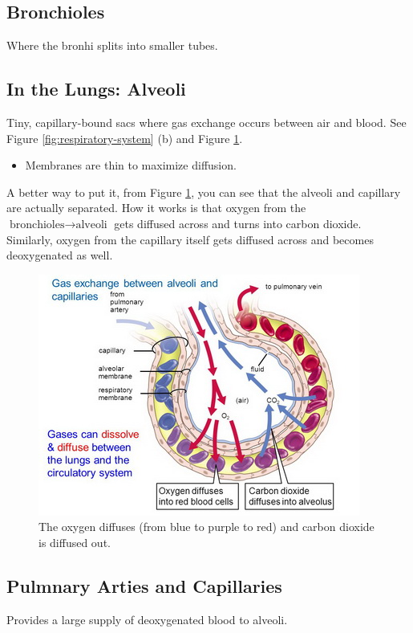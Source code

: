\documentclass[12pt]{report}
\begin{document}
\subsection{Bronchioles}
\begin{definition}[Bronchioles]
    Where the bronhi splits into smaller tubes.
\end{definition}

\divider 

\subsection{In the Lungs: Alveoli}
\begin{definition}
    Tiny, capillary-bound sacs where gas exchange occurs between air and blood. See Figure \ref{fig:respiratory-system} (b) and Figure \ref{fig:alveoli}.
    \begin{itemize}
        \item{Membranes are thin to maximize diffusion.}
    \end{itemize}
    A better way to put it, from Figure \ref{fig:alveoli}, you can see that the alveoli and capillary are actually separated. How it works is that oxygen from the $ \text{bronchioles}\to \text{alveoli}$ gets diffused across and turns into carbon dioxide. Similarly, oxygen from the capillary itself gets diffused across and becomes deoxygenated as well.
\end{definition}

\begin{figure}[H]
\centering
    \includegraphics[width=0.7 \textwidth]{../figures/alveoli2.jpg}
    \caption{The oxygen diffuses (from blue to purple to red) and carbon dioxide is diffused out.}
    \label{fig:alveoli}
\end{figure}

\subsection{Pulmnary Arties and Capillaries}
\begin{definition}
    Provides a large supply of deoxygenated blood to alveoli.
\end{definition}
\end{document}
